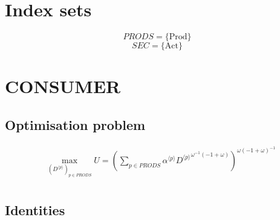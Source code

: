 

\section*{Index sets}

$${P\!R\!O\!D\!S} = \{ \mathrm{Prod} \}$$
$${S\!E\!C} = \{ \mathrm{Act} \}$$

\section{CONSUMER}

\subsection{Optimisation problem}

\begin{align}
&\max_{\left({D}^{\langle p\rangle}\right)_{p\in {P\!R\!O\!D\!S}}
} U = \left(\sum_{p\in {P\!R\!O\!D\!S}} {{\alpha}^{\langle p\rangle}} {{{D}^{\langle p\rangle}}^{{\omega}^{-1} \left(-1 + \omega\right)}}\right)^{{\omega} \left(-1 + \omega\right)^{-1}}\\
\end{align}


\subsection{Identities}

